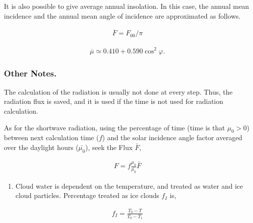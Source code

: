 It is also possible to give average annual insolation. In this case, the
annual mean incidence and the annual mean angle of incidence are approximated as follows.

\begin{eqnarray}
\overline{F} = F_{00}/\pi
\end{eqnarray}

\begin{eqnarray}
\overline{\mu} \simeq 0.410 + 0.590 \cos^2 \varphi .
\end{eqnarray}

\hypertarget{other-notes.}{%
\subsubsection{Other Notes.}\label{other-notes.}}

The calculation of the radiation is usually not done at every step. 
Thus, the radiation flux is saved, and it is used if the time is not used for
radiation calculation. 

As for the shortwave radiation,
using the percentage of time (time is that \(\mu_0>0\)) between next calculation
time (\(f\)) and the solar incidence angle factor averaged over the daylight hours (\(\bar{\mu_0}\)),
seek the Flux \(\bar{F}\),

\begin{eqnarray}
        F =  f \frac{\mu_0}{\bar{\mu_0}} \bar{F}
\end{eqnarray}


\begin{enumerate}
\def\labelenumi{\arabic{enumi}.}
\setcounter{enumi}{1}
\tightlist
\item
  Cloud water is dependent on the temperature, and treated as water and ice cloud
  particles. Percentage treated as ice clouds \(f_I\) is,
\end{enumerate}

\begin{eqnarray}
        f_I = \frac{ T_0 - T }{ T_0 - T_1 }
\end{eqnarray}

